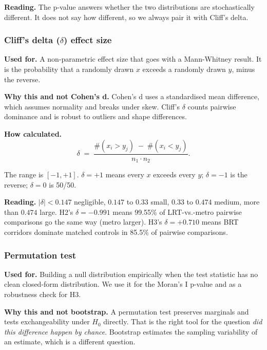 \textbf{Reading.} The p-value answers whether the two distributions
are stochastically different. It does not say how different, so we
always pair it with Cliff's delta.

\subsubsection{Cliff's delta \texorpdfstring{($\delta$)}{} effect size}

\textbf{Used for.} A non-parametric effect size that goes with a
Mann-Whitney result. It is the probability that a randomly drawn $x$
exceeds a randomly drawn $y$, minus the reverse.

\textbf{Why this and not Cohen's d.} Cohen's d uses a standardised
mean difference, which assumes normality and breaks under skew.
Cliff's $\delta$ counts pairwise dominance and is robust to outliers
and shape differences.

\textbf{How calculated.}
\begin{equation*}
  \delta \;=\; \frac{\#(x_i > y_j) \;-\; \#(x_i < y_j)}{n_1 \cdot n_2}.
\end{equation*}

The range is $[-1, +1]$. $\delta = +1$ means every $x$ exceeds every
$y$; $\delta = -1$ is the reverse; $\delta = 0$ is 50/50.

\textbf{Reading.} $|\delta| < 0.147$ negligible, $0.147$ to $0.33$
small, $0.33$ to $0.474$ medium, more than $0.474$ large. H2's
$\delta = -0.991$ means 99.55\% of LRT-vs.-metro pairwise comparisons
go the same way (metro larger). H3's $\delta = +0.710$ means BRT
corridors dominate matched controls in 85.5\% of pairwise
comparisons.

\subsubsection{Permutation test}

\textbf{Used for.} Building a null distribution empirically when the
test statistic has no clean closed-form distribution. We use it for
the Moran's I p-value and as a robustness check for H3.

\textbf{Why this and not bootstrap.} A permutation test preserves
marginals and tests exchangeability under $H_0$ directly. That is the
right tool for the question \emph{did this difference happen by
chance}. Bootstrap estimates the sampling variability of an
estimate, which is a different question.

